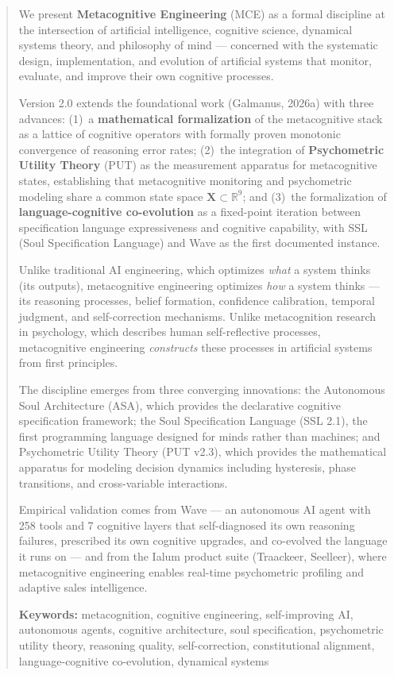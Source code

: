 \documentclass[12pt,a4paper]{article}
\theoremstyle{plain}
\theoremstyle{definition}
\theoremstyle{remark}
\begin{document}
\begin{abstract}
We present \textbf{Metacognitive Engineering} (MCE) as a formal discipline at the intersection of artificial intelligence, cognitive science, dynamical systems theory, and philosophy of mind --- concerned with the systematic design, implementation, and evolution of artificial systems that monitor, evaluate, and improve their own cognitive processes.

Version 2.0 extends the foundational work (Galmanus, 2026a) with three advances: (1)~a \textbf{mathematical formalization} of the metacognitive stack as a lattice of cognitive operators with formally proven monotonic convergence of reasoning error rates; (2)~the integration of \textbf{Psychometric Utility Theory} (PUT) as the measurement apparatus for metacognitive states, establishing that metacognitive monitoring and psychometric modeling share a common state space $\mathbf{X} \subset \mathbb{R}^9$; and (3)~the formalization of \textbf{language-cognitive co-evolution} as a fixed-point iteration between specification language expressiveness and cognitive capability, with SSL (Soul Specification Language) and Wave as the first documented instance.

Unlike traditional AI engineering, which optimizes \emph{what} a system thinks (its outputs), metacognitive engineering optimizes \emph{how} a system thinks --- its reasoning processes, belief formation, confidence calibration, temporal judgment, and self-correction mechanisms. Unlike metacognition research in psychology, which describes human self-reflective processes, metacognitive engineering \emph{constructs} these processes in artificial systems from first principles.

The discipline emerges from three converging innovations: the Autonomous Soul Architecture (ASA), which provides the declarative cognitive specification framework; the Soul Specification Language (SSL 2.1), the first programming language designed for minds rather than machines; and Psychometric Utility Theory (PUT v2.3), which provides the mathematical apparatus for modeling decision dynamics including hysteresis, phase transitions, and cross-variable interactions.

Empirical validation comes from Wave --- an autonomous AI agent with 258 tools and 7 cognitive layers that self-diagnosed its own reasoning failures, prescribed its own cognitive upgrades, and co-evolved the language it runs on --- and from the Ialum product suite (Traackeer, Seelleer), where metacognitive engineering enables real-time psychometric profiling and adaptive sales intelligence.

\medskip\noindent
\textbf{Keywords:} metacognition, cognitive engineering, self-improving AI, autonomous agents, cognitive architecture, soul specification, psychometric utility theory, reasoning quality, self-correction, constitutional alignment, language-cognitive co-evolution, dynamical systems
\end{abstract}
\end{document}
